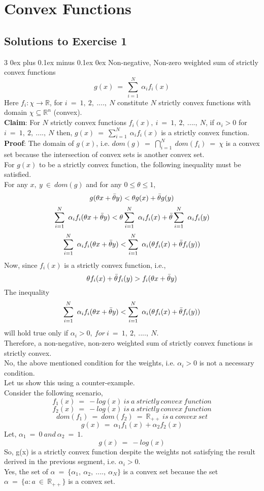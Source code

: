 \documentclass[12pt, draftcls, onecolumn]{IEEEtran}
\makeatletter
\def\subsubsection{\@startsection{subsubsection}%
                                 {3}%
                                 {\z@}%
                                 {0ex plus 0.1ex minus 0.1ex}%
                                 {0ex}%
                                 {\normalfont\normalsize\bfseries}}%
\makeatother
\begin{document}
\section{Convex Functions}
\subsection{Solutions to Exercise 1}
\subsubsection{Non-negative, Non-zero weighted sum of strictly convex functions}
\[g(x)\ =\ \sum_{i=1}^N\ \alpha_i f_i(x)\]
Here $f_i: \chi \rightarrow \mathbb{R}$, for $i\ =\ 1,\ 2,\ ....,\ N$ constitute $N$ strictly convex functions with domain $\chi \subseteq \mathbb{R}^n$ (convex). 
\\\textbf{Claim}: For $N$ strictly convex functions $f_i(x),\ i\ =\ 1,\ 2,\ ....,\ N$, if $\alpha_i > 0$ for $i\ =\ 1,\ 2,\ ....,\ N$ then, $g(x)\ =\ \sum_{i=1}^N\ \alpha_if_i(x)$ is a strictly convex function.
\\\textbf{Proof}: The domain of $g(x)$, i.e. $dom(g)\ =\ \bigcap_{i=1}^N\ dom(f_i)\ =\ \chi$ is a convex set because the intersection of convex sets is another convex set.
\\For $g(x)$ to be a strictly convex function, the following inequality must be satisfied.
\\For any $x,\ y\ \in\ dom(g)$ and for any $0 \leq \theta \leq 1$,
\[g(\theta x + \Bar{\theta} y) < \theta g(x) + \Bar{\theta} g(y)\]
\[\sum_{i=1}^N\ \alpha_i f_i(\theta x + \Bar{\theta} y) < \theta \sum_{i=1}^N\ \alpha_i f_i(x) + \Bar{\theta} \sum_{i=1}^N\ \alpha_i f_i(y)\]
\[\sum_{i=1}^N\ \alpha_i f_i(\theta x + \Bar{\theta} y) < \sum_{i=1}^N\ \alpha_i(\theta f_i(x) + \Bar{\theta} f_i(y))\]
Now, since $f_i(x)$ is a strictly convex function, i.e.,
\[\theta f_i(x) + \Bar{\theta} f_i(y) > f_i(\theta x + \Bar{\theta} y)\]
The inequality
\[\sum_{i=1}^N\ \alpha_i f_i(\theta x + \Bar{\theta} y) < \sum_{i=1}^N\ \alpha_i(\theta f_i(x) + \Bar{\theta} f_i(y))\]
will hold true only if $\alpha_i > 0,\ for\ i\ =\ 1,\ 2,\ ....,\ N$.
\\Therefore, a non-negative, non-zero weighted sum of strictly convex functions is strictly convex.
\\No, the above mentioned condition for the weights, i.e. $\alpha_i > 0$ is not a necessary condition. 
\\Let us show this using a counter-example.
\\Consider the following scenario,
\[f_1(x)\ =\ -log(x)\ is\ a\ strictly\ convex\ function\]
\[f_2(x)\ =\ -log(x)\ is\ a\ strictly\ convex\ function\]
\[dom(f_1)\ =\ dom(f_2)\ =\ \mathbb{R}_{++}\ is\ a\ convex\ set\]
\[g(x)\ =\ \alpha_1 f_1(x) + \alpha_2 f_2(x)\]
Let, $\alpha_1\ =\ 0\ and\ \alpha_2\ =\ 1$.
\[g(x)\ =\ -log(x)\]
So, g(x) is a strictly convex function despite the weights not satisfying the result derived in the previous segment, i.e. $\alpha_i > 0$.
\\Yes, the set of $\alpha\ =\ \{\alpha_1,\ \alpha_2,\ ....,\ \alpha_N\}$ is a convex set because the set $\alpha\ =\ \{a: a\ \in\ \mathbb{R}_{++}\}$ is a convex set.
\end{document}
